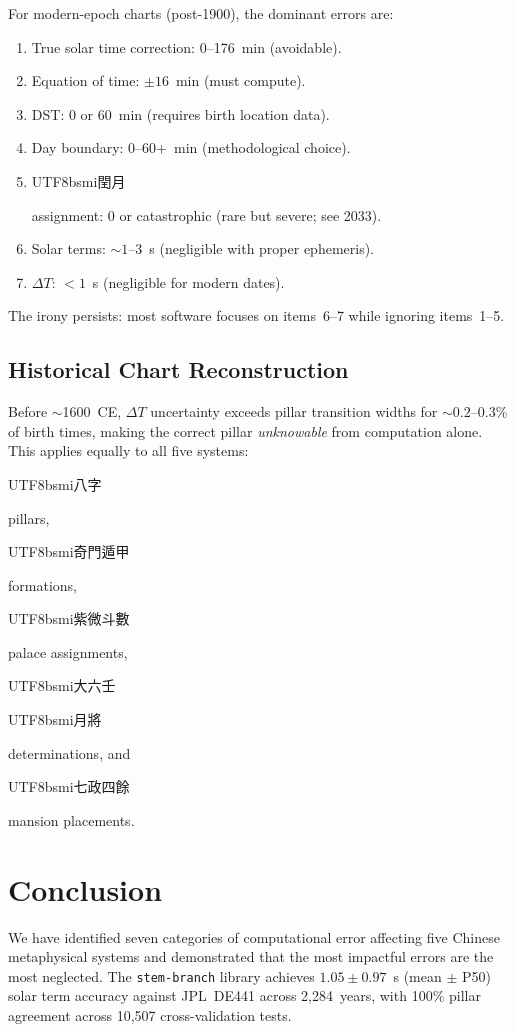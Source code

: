 \documentclass[10pt,a4paper]{article}
\newcommand{\zh}[1]{\begin{CJK}{UTF8}{bsmi}#1\end{CJK}}
\begin{document}
For modern-epoch charts (post-1900), the dominant errors are:

\begin{enumerate}
  \item True solar time correction: 0--176~min (avoidable).
  \item Equation of time: $\pm 16$~min (must compute).
  \item DST: 0 or 60~min (requires birth location data).
  \item Day boundary: 0--60+~min (methodological choice).
  \item \zh{閏月} assignment: 0 or catastrophic (rare but severe; see 2033).
  \item Solar terms: $\sim 1$--$3$~s (negligible with proper ephemeris).
  \item $\Delta T$: $< 1$~s (negligible for modern dates).
\end{enumerate}

The irony persists: most software focuses on items~6--7 while ignoring
items~1--5.

\subsection{Historical Chart Reconstruction}

Before $\sim$1600~CE, $\Delta T$ uncertainty exceeds pillar transition
widths for $\sim 0.2$--$0.3$\% of birth times, making the correct pillar
\emph{unknowable} from computation alone. This applies equally to all five
systems: \zh{八字} pillars, \zh{奇門遁甲} formations, \zh{紫微斗數}
palace assignments, \zh{大六壬} \zh{月將} determinations, and
\zh{七政四餘} mansion placements.

\section{Conclusion}
\label{sec:conclusion}

We have identified seven categories of computational error affecting five
Chinese metaphysical systems and demonstrated that the most impactful
errors are the most neglected. The \texttt{stem-branch} library achieves
$1.05 \pm 0.97$~s (mean $\pm$ P50) solar term accuracy against JPL~DE441
across 2,284~years, with 100\% pillar agreement across 10,507
cross-validation tests.
\end{document}

